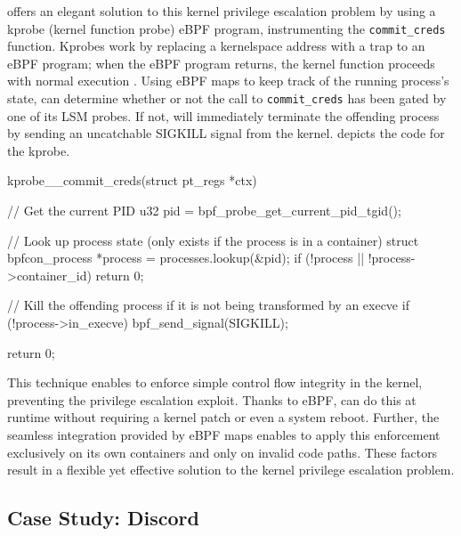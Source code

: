 \bpfcontain{} offers an elegant solution to this kernel privilege escalation problem by using a kprobe (kernel function probe) eBPF program, instrumenting the \texttt{commit\_creds} function. Kprobes work by replacing a kernelspace address with a trap to an eBPF program; when the eBPF program returns, the kernel function proceeds with normal execution \cite{gregg2019_bpf}. Using eBPF maps to keep track of the running process's state, \bpfcontain{} can determine whether or not the call to \texttt{commit\_creds} has been gated by one of its LSM probes. If not, \bpfcontain{} will immediately terminate the offending process by sending an uncatchable SIGKILL signal from the kernel.  depicts the code for the kprobe.

\begin{listing}[language=c, caption={\bpfcontain{}'s \texttt{commit\_creds} kprobe. This code consists of a query to the eBPF map holding \bpfcontain{}'s process states, killing the process if it is not being transformed by an execve operation (as flagged by \bpfcontain{}'s LSM probes).}, label={lst:priv_protection}, gobble=2]
  kprobe__commit_creds(struct pt_regs *ctx) {
    // Get the current PID
    u32 pid = bpf_probe_get_current_pid_tgid();

    // Look up process state (only exists if the process is in a container)
    struct bpfcon_process *process = processes.lookup(&pid);
    if (!process || !process->container_id)
      return 0;

    // Kill the offending process if it is not being transformed by an execve
    if (!process->in_execve)
      bpf_send_signal(SIGKILL);

    return 0;
  }
\end{listing}

 This technique enables \bpfcontain{} to enforce simple control flow integrity in the kernel, preventing the privilege escalation exploit. Thanks to eBPF, \bpfcontain{} can do this at runtime without requiring a kernel patch or even a system reboot. Further, the seamless integration provided by eBPF maps enables \bpfcontain{} to apply this enforcement exclusively on its own containers and only on invalid code paths. These factors result in a flexible yet effective solution to the kernel privilege escalation problem.

\subsection{Case Study: Discord}
\label{sub:case_studies}

